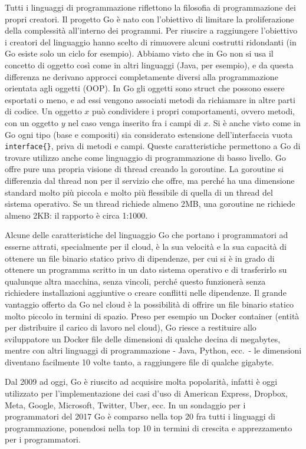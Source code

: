 Tutti i linguaggi di programmazione riflettono la filosofia di programmazione dei propri creatori.
Il progetto Go è nato con l'obiettivo di limitare la proliferazione della complessità all'interno dei programmi.
Per riuscire a raggiungere l'obiettivo i creatori del linguaggio hanno scelto di rimuovere alcuni costrutti ridondanti (in Go esiste solo un ciclo for esempio).
Abbiamo visto che in Go non si usa il concetto di oggetto così come in altri linguaggi (Java, per esempio), e da questa differenza ne derivano approcci completamente diversi alla programmazione orientata agli oggetti (OOP).
In Go gli oggetti sono struct che possono essere esportati o meno, e ad essi vengono associati metodi da richiamare in altre parti di codice.
Un oggetto $x$ può condividere i propri comportamenti, ovvero metodi, con un oggetto $y$ nel caso venga inserito fra i campi di $x$.
Si è anche visto come in Go ogni tipo (base e compositi) sia considerato estensione dell'interfaccia vuota \verb|interface{}|, priva di metodi e campi.
Queste caratteristiche permettono a Go di trovare utilizzo anche come linguaggio di programmazione di basso livello.
Go offre pure una propria visione di thread creando la goroutine.
La goroutine si differenzia dal thread non per il servizio che offre, ma perché ha una dimensione standard molto più piccola e molto più flessibile di quella di un thread del sistema operativo.
Se un thread richiede almeno 2MB, una goroutine ne richiede almeno 2KB: il rapporto è circa 1:1000.

Alcune delle caratteristiche del linguaggio Go che portano i programmatori ad esserne attrati, specialmente per il cloud, è la sua velocità e la sua capacità di ottenere un file binario statico privo di dipendenze, per cui si è in grado di ottenere un programma scritto in un dato sistema operativo e di trasferirlo su qualunque altra macchina, senza vincoli, perché questo funzionerà senza richiedere installazioni aggiuntive o creare conflitti nelle dipendenze.
Il grande vantaggio offerto da Go nel cloud è la possibilità di offrire un file binario statico molto piccolo in termini di spazio.
Preso per esempio un Docker container (entità per distribuire il carico di lavoro nel cloud), Go riesce a restituire allo sviluppatore un Docker file delle dimensioni di qualche decina di megabytes, mentre con altri linguaggi di programmazione - Java, Python, ecc.\ - le dimensioni diventano facilmente 10 volte tanto, a raggiungere file di qualche gigabyte.

Dal 2009 ad oggi, Go è riuscito ad acquisire molta popolarità, infatti è oggi utilizzato per l'implementazione dei casi d'uso di American Express, Dropbox, Meta, Google, Microsoft, Twitter, Uber, ecc.
In un sondaggio per i programmatori del 2017 Go è comparso nella top 20 fra tutti i linguaggi di programmazione, ponendosi nella top 10 in termini di crescita e apprezzamento per i programmatori.

